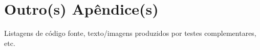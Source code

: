 \chapter{Outro(s) Apêndice(s)}
\label{apendice2}

Listagens de código fonte, texto/imagens produzidos por testes complementares, etc.